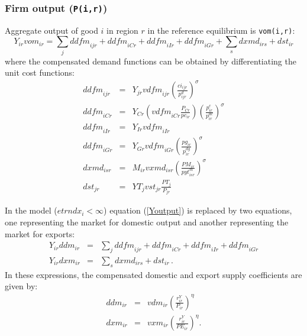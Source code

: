 \subsubsection[Firm output]{Firm output (\texttt{P(i,r)})}

Aggregate output of good $i$ in region $r$ in the reference equilibrium is
\texttt{vom(i,r)}:
\begin{equation}
\label{Youtput}
Y_{ir} \textit{vom}_{ir} =
\sum_j \textit{ddfm}_{ijr} + \textit{ddfm}_{iCr} + \textit{ddfm}_{iIr}
+ \textit{ddfm}_{iGr} + \sum_s \textit{dxmd}_{irs} + \textit{dst}_{ir}
\end{equation}
where the compensated demand functions can be obtained by
differentiating the unit cost functions:
\begin{eqnarray}
\textit{ddfm}_{ijr} &=& Y_{jr} \textit{vdfm}_{ijr} \left( \frac{\textit{ci}_{ijr}}{p^d_{ijr}} \right)^\sigma \nonumber\\
\textit{ddfm}_{iCr}  &=& Y_{Cr} \left( \textit{vdfm}_{iCr}\frac{P_{Cr}}{pc_{ir}} \right) \left(\frac{p^c_{ir}}{p^{\textit{dc}}_{ir}} \right)^\sigma \nonumber\\
\textit{ddfm}_{iIr}  &=& Y_{Ir} \textit{vdfm}_{iIr} \nonumber\\
\textit{ddfm}_{iGr} &=& Y_{Gr} \textit{vdfm}_{iGr}\left(\frac{pg_{ir}}{p^{\textit{dg}}_{ir}} \right)^\sigma   \nonumber\\
\textit{dxmd}_{isr} &=& M_{ir} \textit{vxmd}_{isr} \left(\frac{\mathit{PM}_{ir}}{\textit{pyt}^m_{isr}} \right)^\sigma \nonumber\\
\textit{dst}_{jr} &=& \textit{YT}_j  \textit{vst}_{jr} \frac{\mathit{PT}_j}{P_{jr}}\nonumber
\end{eqnarray}

In the \SOE model ($\textit{etrndx}_{i}<\infty$) equation
(\ref{Youtput}) is replaced by two equations, one representing the
market for domestic output and another representing the market for
exports:
\begin{eqnarray}
Y_{ir} \textit{ddm}_{ir} &=&
\sum_j \textit{ddfm}_{ijr} + \textit{ddfm}_{iCr} + \textit{ddfm}_{iIr}
+ \textit{ddfm}_{iGr} \label{Doutput}\\
Y_{ir} \textit{dxm}_{ir} &=&
\sum_s \textit{dxmd}_{irs} + \textit{dst}_{ir}
\,.\label{Xoutput}
\end{eqnarray}
In these expressions, the compensated domestic and export supply
coefficients are given by:
\begin{eqnarray}
\textit{ddm}_{ir} &=& \textit{vdm}_{ir} \left( \frac{ r^Y_{ir} } {
P_{ir}} \right)^{\eta} \nonumber \\
\textit{dxm}_{ir} &=& \textit{vxm}_{ir} \left( \frac{ r^Y_{ir} } {
\mathit{PE}_{ir}} \right)^{\eta}. \nonumber
\end{eqnarray}

